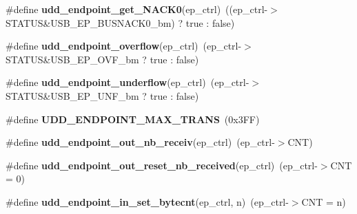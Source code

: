 \begin{DoxyCompactItemize}
\item 
\hypertarget{group__udd__xmega__usb__group_gae47ea293fe31fcf7592b35b28bc732a1}{\#define {\bfseries udd\-\_\-endpoint\-\_\-get\-\_\-\-N\-A\-C\-K0}(ep\-\_\-ctrl)~((ep\-\_\-ctrl-\/$>$S\-T\-A\-T\-U\-S\&U\-S\-B\-\_\-\-E\-P\-\_\-\-B\-U\-S\-N\-A\-C\-K0\-\_\-bm) ? true \-: false)}\label{group__udd__xmega__usb__group_gae47ea293fe31fcf7592b35b28bc732a1}

\item 
\hypertarget{group__udd__xmega__usb__group_ga7faab4cb3630357695f2a5f0ed1935c4}{\#define {\bfseries udd\-\_\-endpoint\-\_\-overflow}(ep\-\_\-ctrl)~(ep\-\_\-ctrl-\/$>$S\-T\-A\-T\-U\-S\&U\-S\-B\-\_\-\-E\-P\-\_\-\-O\-V\-F\-\_\-bm ? true \-: false)}\label{group__udd__xmega__usb__group_ga7faab4cb3630357695f2a5f0ed1935c4}

\item 
\hypertarget{group__udd__xmega__usb__group_gabcbb67d30efaf7270d9b6ad4cc59bbdc}{\#define {\bfseries udd\-\_\-endpoint\-\_\-underflow}(ep\-\_\-ctrl)~(ep\-\_\-ctrl-\/$>$S\-T\-A\-T\-U\-S\&U\-S\-B\-\_\-\-E\-P\-\_\-\-U\-N\-F\-\_\-bm ? true \-: false)}\label{group__udd__xmega__usb__group_gabcbb67d30efaf7270d9b6ad4cc59bbdc}

\item 
\hypertarget{group__udd__xmega__usb__group_ga9b73a2cd4488b39038d49d865e03fe0e}{\#define {\bfseries U\-D\-D\-\_\-\-E\-N\-D\-P\-O\-I\-N\-T\-\_\-\-M\-A\-X\-\_\-\-T\-R\-A\-N\-S}~(0x3\-F\-F)}\label{group__udd__xmega__usb__group_ga9b73a2cd4488b39038d49d865e03fe0e}

\item 
\hypertarget{group__udd__xmega__usb__group_ga904d1887320cac074f175b423811db61}{\#define {\bfseries udd\-\_\-endpoint\-\_\-out\-\_\-nb\-\_\-receiv}(ep\-\_\-ctrl)~(ep\-\_\-ctrl-\/$>$C\-N\-T)}\label{group__udd__xmega__usb__group_ga904d1887320cac074f175b423811db61}

\item 
\hypertarget{group__udd__xmega__usb__group_gaef854961b312c4b6fa9c7f0241a0d74f}{\#define {\bfseries udd\-\_\-endpoint\-\_\-out\-\_\-reset\-\_\-nb\-\_\-received}(ep\-\_\-ctrl)~(ep\-\_\-ctrl-\/$>$C\-N\-T = 0)}\label{group__udd__xmega__usb__group_gaef854961b312c4b6fa9c7f0241a0d74f}

\item 
\hypertarget{group__udd__xmega__usb__group_ga070229059685cb8077547b3f1361c1a1}{\#define {\bfseries udd\-\_\-endpoint\-\_\-in\-\_\-set\-\_\-bytecnt}(ep\-\_\-ctrl, n)~(ep\-\_\-ctrl-\/$>$C\-N\-T = n)}\label{group__udd__xmega__usb__group_ga070229059685cb8077547b3f1361c1a1}


\end{DoxyCompactItemize}
